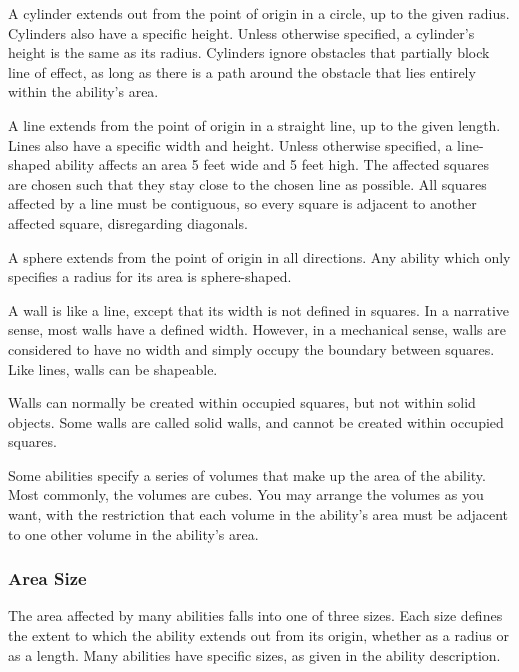              A cylinder extends out from the point of origin in a circle, up to the given radius.
            Cylinders also have a specific height.
            Unless otherwise specified, a cylinder's height is the same as its radius.
            Cylinders ignore obstacles that partially block line of effect, as long as there is a path around the obstacle that lies entirely within the ability's area.

             A line extends from the point of origin in a straight line, up to the given length.
            Lines also have a specific width and height.
            Unless otherwise specified, a line-shaped ability affects an area 5 feet wide and 5 feet high.
            The affected squares are chosen such that they stay close to the chosen line as possible.
            All squares affected by a line must be contiguous, so every square is adjacent to another affected square, disregarding diagonals.

             A sphere extends from the point of origin in all directions.
            Any ability which only specifies a radius for its area is sphere-shaped.

             A wall is like a line, except that its width is not defined in squares.
            In a narrative sense, most walls have a defined width.
            However, in a mechanical sense, walls are considered to have no width and simply occupy the boundary between squares.
            Like lines, walls can be shapeable.

            Walls can normally be created within occupied squares, but not within solid objects.
            Some walls are called solid walls, and cannot be created within occupied squares.

             Some abilities specify a series of volumes that make up the area of the ability.
            Most commonly, the volumes are cubes.
            You may arrange the volumes as you want, with the restriction that each volume in the ability's area must be adjacent to one other volume in the ability's area.

        \subsubsection{Area Size}

            The area affected by many abilities falls into one of three sizes.
            Each size defines the extent to which the ability extends out from its origin, whether as a radius or as a length.
            Many abilities have specific sizes, as given in the ability description.

